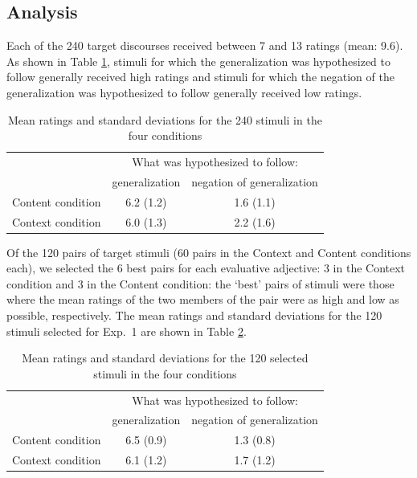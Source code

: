 \documentclass[11pt,fleqn]{article}
\newcommand{\6}{\mbox{$[\hspace*{-.6mm}[$}}
\newcommand{\9}{\mbox{$]\hspace*{-.6mm}]$}}
\begin{document}
\subsection{Analysis}

Each of the 240 target discourses received between 7 and 13 ratings (mean: 9.6). As shown in Table \ref{t-mean-norming1}, stimuli for which the generalization was hypothesized to follow generally received high ratings and stimuli for which the negation of the generalization was hypothesized to follow generally received low ratings.

\begin{table}[!h]
\centering

\begin{tabular}{l|cc}
& \multicolumn{2}{c}{What was hypothesized to follow:} \\
& generalization & negation of generalization \\\hline

Content condition &  6.2 (1.2) &  1.6 (1.1) \\
Context condition &  6.0 (1.3) &  2.2 (1.6) \\

\hline
\end{tabular}

\caption{Mean ratings and standard deviations for the 240 stimuli in the four conditions}\label{t-mean-norming1}

\end{table}

Of the 120 pairs of target stimuli (60 pairs in the Context and Content conditions each), we selected the 6 best pairs for each evaluative adjective: 3 in the Context condition and 3 in the Content condition: the `best' pairs of stimuli were those where the mean ratings of the two members of the pair were as high and low as possible, respectively. The mean ratings and standard deviations for the 120 stimuli selected for Exp.~1 are shown in Table \ref{t-mean-final}.

\begin{table}[!h]
\centering

\begin{tabular}{l|cc}
& \multicolumn{2}{c}{What was hypothesized to follow:} \\
& generalization & negation of generalization \\\hline

Content condition &  6.5 (0.9) &  1.3 (0.8) \\
Context condition &  6.1 (1.2) &  1.7 (1.2) \\

\hline
\end{tabular}

\caption{Mean ratings and standard deviations for the 120 selected stimuli in the four conditions}\label{t-mean-final}

\end{table}
\end{document}
